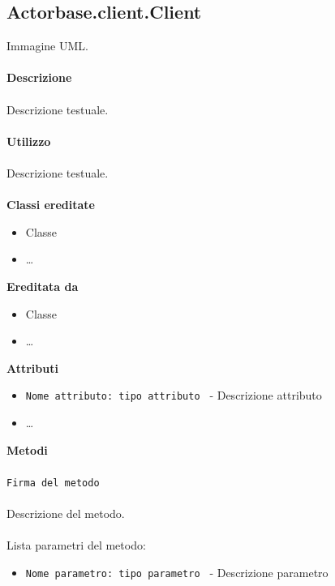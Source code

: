\documentclass[a4paper]{article}
\begin{document}
	\subsection{Actorbase.client.Client}	
		Immagine UML.
		\\ \\
		\textbf{Descrizione}
			\\ \\
			Descrizione testuale.
			\\ \\
		\textbf{Utilizzo}
			\\ \\
			Descrizione testuale.
			\\ \\
		\textbf{Classi ereditate}
			\begin{itemize}
				\item Classe
				\item \dots
			\end{itemize}
		\textbf{Ereditata da}
			\begin{itemize}
				\item Classe
				\item \dots
			\end{itemize}
		\textbf{Attributi}
			\begin{itemize}
				\item \texttt{Nome attributo: tipo attributo } - Descrizione attributo
				\item \dots
			\end{itemize}
		\textbf{Metodi}
			\\ \\
			\texttt{Firma del metodo}
			\\ \\
			Descrizione del metodo.
			\\ \\
			Lista parametri del metodo:
			\begin{itemize}
				\item \texttt{Nome parametro: tipo parametro } - Descrizione parametro
			\end{itemize}
			
\end{document}
